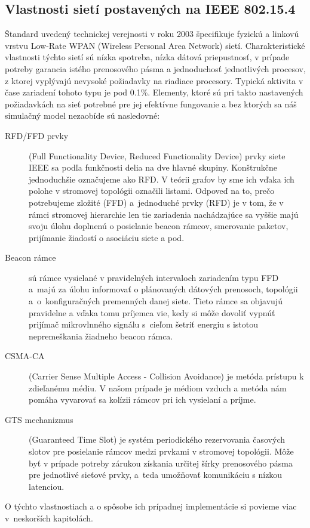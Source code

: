 \subsection{Vlastnosti sietí postavených na IEEE 802.15.4}
\indent\indent Štandard uvedený technickej verejnosti v roku 2003 špecifikuje fyzickú a linkovú vrstvu Low-Rate WPAN (Wireless Personal Area Network) sietí. Charakteristické vlastnosti týchto sietí sú nízka spotreba, nízka dátová priepustnosť, v prípade potreby garancia istého prenosového pásma a jednoduchosť jednotlivých procesov, z ktorej vyplývajú nevysoké požiadavky na riadiace procesory. Typická aktivita v čase zariadení tohoto typu je pod 0.1\%. Elementy, ktoré sú pri takto nastavených požiadavkách na sieť potrebné pre jej efektívne fungovanie a bez ktorých sa náš simulačný model nezaobíde sú nasledovné:
\begin{description}
  \item[RFD/FFD prvky] (Full Functionality Device, Reduced Functionality Device) prvky siete IEEE sa podľa funkčnosti delia na dve hlavné skupiny. Konštrukčne jednoduchšie označujeme ako RFD. V teórii grafov by sme ich vďaka ich polohe v stromovej topológii označili listami. Odpoveď na to, prečo potrebujeme zložité (FFD) a~jednoduché prvky (RFD) je v tom, že v rámci stromovej hierarchie len tie zariadenia nachádzajúce sa vyššie majú svoju úlohu doplnenú o posielanie beacon rámcov, smerovanie paketov, prijímanie žiadostí o asociáciu siete a pod.
  \item[Beacon rámce] sú rámce vysielané v pravidelných intervaloch zariadením typu FFD a~majú za úlohu informovať o plánovaných dátových prenosoch, topológii a~o~konfiguračných premenných danej siete. Tieto rámce sa objavujú pravidelne a vďaka tomu príjemca vie, kedy si môže dovoliť vypnúť prijímač mikrovlnného signálu s~cieľom šetriť energiu s istotou nepremeškania žiadneho beacon rámca.
  \item[CSMA-CA] (Carrier Sense Multiple Access - Collision Avoidance) je metóda prístupu k zdieľanému médiu. V našom prípade je médiom vzduch a metóda nám pomáha vyvarovať sa kolízii rámcov pri ich vysielaní a príjme.
  \item[GTS mechanizmus] (Guaranteed Time Slot) je systém periodického rezervovania časových slotov pre posielanie rámcov medzi prvkami v stromovej topológii. Môže byť v prípade potreby zárukou získania určitej šírky prenosového pásma pre jednotlivé sieťové prvky, a~teda umožňovať komunikáciu s nízkou latenciou.
 \end{description}
\indent\indent O týchto vlastnostiach a o spôsobe ich prípadnej implementácie si povieme viac v~neskorších kapitolách.
